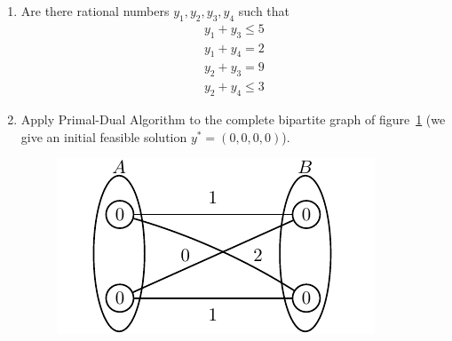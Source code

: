 \begin{enumerate}
   \item   Are there rational numbers $y_1, y_2, y_3, y_4$ such 
           that 
           \begin{displaymath}
              \begin{array}{c}
                 y_1 + y_3 \leq 5 \\
                 y_1 + y_4 = 2 \\
                 y_2 + y_3 = 9 \\
                 y_2 + y_4 \leq 3
              \end{array}
           \end{displaymath}
           
   \item   Apply Primal-Dual Algorithm to the complete bipartite 
           graph of figure~\ref{fig:exprimaldualalgo} (we give 
           an initial feasible solution $y^*=(0,0,0,0)$).
           \begin{figure}[htbp]
             \begin{center}
               \includegraphics{figures/exprimaldualalgo.pdf}
             \end{center}
             \caption{}
               \label{fig:exprimaldualalgo}
           \end{figure}
           
\end{enumerate}


 